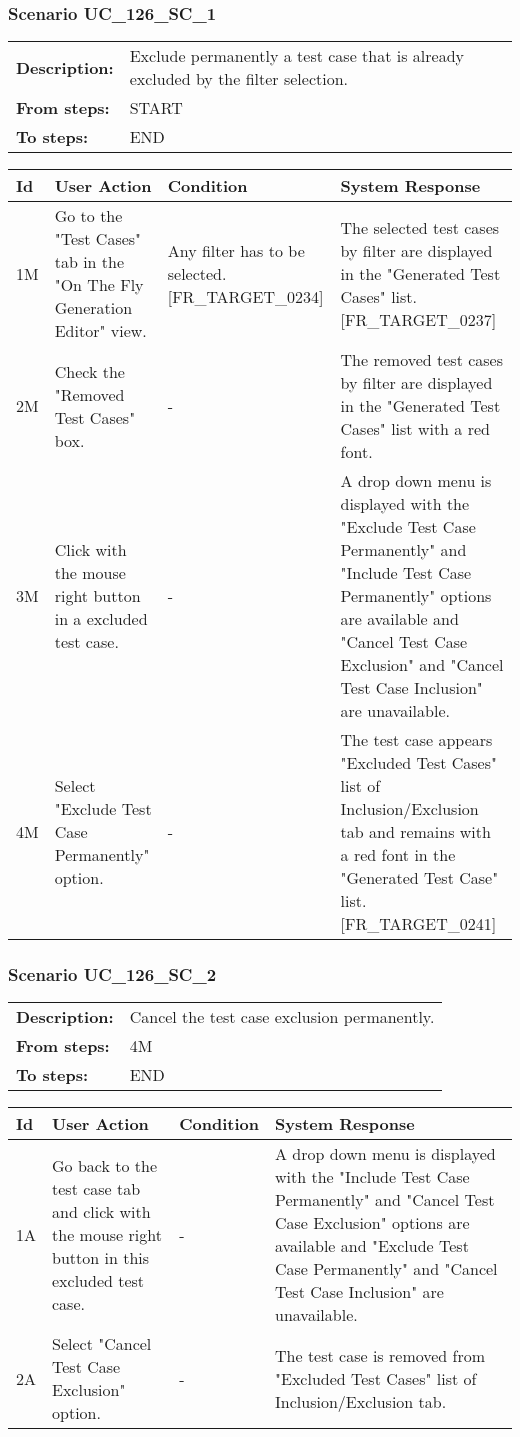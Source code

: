 \documentclass[a4paper,11pt]{article}
\newcommand{\bl}{\\ \hline}
\begin{document}
\subsubsection*{Scenario UC_126_SC_1}
\begin{tabular}{p{1in}p{4in}}
{\bf Description:} & Exclude permanently a test case that is already excluded by the filter selection. \\
{\bf From steps:} & START \\
{\bf To steps:} & END \\
\end{tabular}
 
\begin{tabular}{|p{0.8in}|p{1.6in}|p{1.6in}|p{1.6in}|}
\hline
Id & User Action & Condition & System Response  \bl 
1M & Go to the "Test Cases" tab in the "On The Fly Generation Editor" view. & Any filter has to be selected. [FR_TARGET_0234] & The selected test cases by filter are displayed in the "Generated Test Cases" list. [FR_TARGET_0237] \bl 
2M & Check the "Removed Test Cases" box. & - & The removed test cases by filter are displayed in the "Generated Test Cases" list with a red font. \bl 
3M & Click with the mouse right button in a excluded test case. & - & A drop down menu is displayed with the "Exclude Test Case Permanently" and "Include Test Case Permanently" options are available and "Cancel Test Case Exclusion" and "Cancel Test Case Inclusion" are unavailable. \bl 
4M & Select "Exclude Test Case Permanently" option. & - & The test case appears "Excluded Test Cases" list of Inclusion/Exclusion tab and remains with a red font in the "Generated Test Case" list. [FR_TARGET_0241] \bl 
\end{tabular}
\subsubsection*{Scenario UC_126_SC_2}
\begin{tabular}{p{1in}p{4in}}
{\bf Description:} & Cancel the test case exclusion permanently. \\
{\bf From steps:} & 4M \\
{\bf To steps:} & END \\
\end{tabular}
 
\begin{tabular}{|p{0.8in}|p{1.6in}|p{1.6in}|p{1.6in}|}
\hline
Id & User Action & Condition & System Response  \bl 
1A & Go back to the test case tab and click with the mouse right button in this excluded test case. & - & A drop down menu is displayed with the "Include Test Case Permanently" and "Cancel Test Case Exclusion" options are available and "Exclude Test Case Permanently" and "Cancel Test Case Inclusion" are unavailable. \bl 
2A & Select "Cancel Test Case Exclusion" option. & - & The test case is removed from "Excluded Test Cases" list of Inclusion/Exclusion tab. \bl 
\end{tabular}
\end{document}
